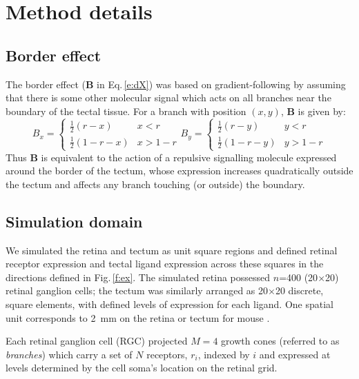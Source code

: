 \documentclass[9pt]{elife} %
\begin{document}
\section{Method details}

\subsection*{Border effect} %
The border effect ($\mathbf{B}$ in Eq.\,\ref{e:dX}) was based on gradient-following by assuming that there is some other molecular signal which acts on all branches near the boundary of the tectal tissue. For a branch with position $(x,y)$, $\mathbf{B}$ is given by:
%
\begin{equation}\label{e:B}
B_x = \begin{cases}
        \frac{1}{2} (r-x)     & x<r \\
        \frac{1}{2} (1-r-x)    & x>1-r
\end{cases}
B_y = \begin{cases}
        \frac{1}{2} (r-y)      & y<r \\
        \frac{1}{2} (1-r-y)    & y>1-r
\end{cases}
\end{equation}
%
Thus $\mathbf{B}$ is equivalent to the action of a repulsive signalling molecule expressed around the border of the tectum, whose expression increases quadratically outside the tectum and affects any branch touching (or outside) the boundary.

\subsection*{Simulation domain}
We simulated the retina and tectum as unit square regions and defined retinal receptor expression and tectal ligand expression across these squares in the directions defined in Fig.\,\ref{f:ex}.
The simulated retina possessed $n$=400 (20$\times$20) retinal ganglion cells; the tectum was similarly arranged as 20$\times$20 discrete, square elements, with defined levels of expression for each ligand.
One spatial unit corresponds to 2~mm on the retina or tectum for mouse \citep{reber_relative_2004}.

Each retinal ganglion cell (RGC) projected $M=4$ growth cones (referred to as \emph{branches}) which carry a set of $N$ receptors, $r_i$, indexed by $i$ and expressed at levels determined by the cell soma's location on the retinal grid.
\end{document}
